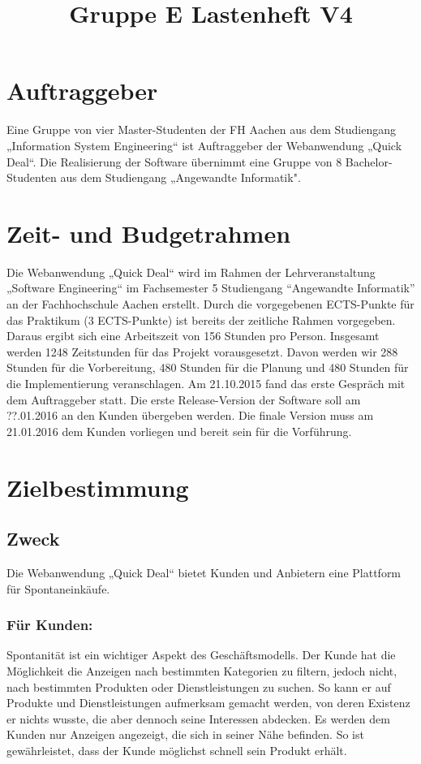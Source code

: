 \documentclass[a4paper,12pt,oneside]{scrartcl}
\title{Gruppe E Lastenheft V4}
\begin{document}
\maketitle
\newpage
\tableofcontents
\newpage

\section{Auftraggeber}
Eine Gruppe von vier Master-Studenten der FH Aachen aus dem Studiengang „Information System Engineering“ ist Auftraggeber der Webanwendung „Quick Deal“.
Die Realisierung der Software übernimmt eine Gruppe von 8 Bachelor-Studenten aus dem Studiengang „Angewandte Informatik".




\section{Zeit- und Budgetrahmen}
Die Webanwendung „Quick Deal“ wird im Rahmen der Lehrveranstaltung „Software Engineering“ im Fachsemester 5 Studiengang “Angewandte Informatik” an der Fachhochschule Aachen erstellt.
Durch die vorgegebenen ECTS-Punkte für das Praktikum (3 ECTS-Punkte) ist bereits der zeitliche Rahmen vorgegeben.
Daraus ergibt sich eine Arbeitszeit von 156 Stunden pro Person.
Insgesamt werden 1248 Zeitstunden für das Projekt vorausgesetzt. 
Davon werden wir 288 Stunden für die Vorbereitung, 480 Stunden für die Planung und 480 Stunden für die Implementierung veranschlagen. 
Am 21.10.2015 fand das erste Gespräch mit dem Auftraggeber statt.
Die erste Release-Version der Software soll am ??.01.2016 an den Kunden übergeben werden.
Die finale Version muss am 21.01.2016 dem Kunden vorliegen und bereit sein für die Vorführung.




\section{Zielbestimmung}
\subsection{Zweck}
Die Webanwendung „Quick Deal“ bietet Kunden und Anbietern eine Plattform für Spontaneinkäufe.
\subsubsection*{Für Kunden:}
Spontanität ist ein wichtiger Aspekt des Geschäftsmodells.
Der Kunde hat die Möglichkeit die Anzeigen nach bestimmten Kategorien zu filtern, jedoch nicht, nach bestimmten Produkten oder Dienstleistungen zu suchen.
So kann er auf Produkte und Dienstleistungen aufmerksam gemacht werden, von deren Existenz er nichts wusste, die aber dennoch seine Interessen abdecken.
Es werden dem Kunden nur Anzeigen angezeigt, die sich in seiner Nähe befinden.
So ist gewährleistet, dass der Kunde möglichst schnell sein Produkt erhält.
\end{document}
